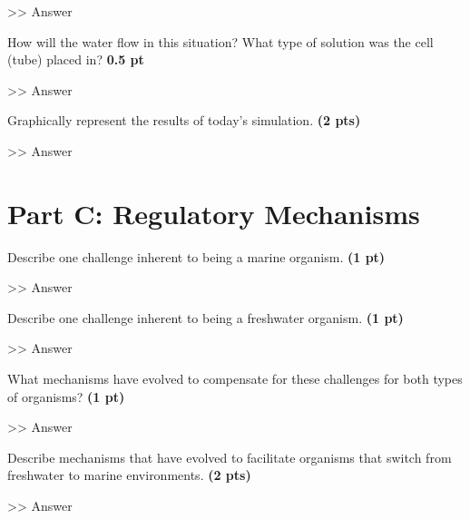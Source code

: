 \documentclass[12pt,a4paper]{article}
\begin{document}
\begin{enumerate}[font=\bfseries, wide, resume]
\begin{enumerate}
        >> Answer 

        {\color{under}\item How will the water flow in this situation? What type of solution was the cell (tube) placed in? \textbf{0.5 pt}}

        >> Answer 
    \end{enumerate}

    {\color{under}\item Graphically represent the results of today’s simulation.  \textbf{(2 pts)}}

    >> Answer

\end{enumerate}
    
\section*{Part C: Regulatory Mechanisms}
\begin{enumerate}[font=\bfseries, wide, resume]
    {\color{under}\item Describe one challenge inherent to being a marine organism.  \textbf{(1 pt)}}

    >> Answer

    {\color{under}\item Describe one challenge inherent to being a freshwater organism.  \textbf{(1 pt)}}

    >> Answer

    {\color{under}\item What mechanisms have evolved to compensate for these challenges for both types of organisms?  \textbf{(1 pt)}}

    >> Answer

    {\color{under}\item Describe mechanisms that have evolved to facilitate organisms that switch from freshwater to marine environments. \textbf{(2 pts)}}

    >> Answer

\end{enumerate}
\end{document}
